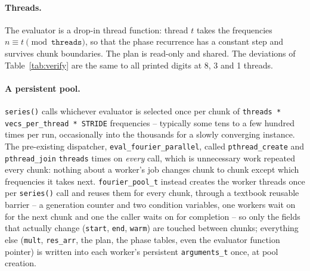 \documentclass[11pt]{article}
\begin{document}
\paragraph{Threads.} The evaluator is a drop-in thread function: thread $t$ takes the frequencies
$n\equiv t\pmod{\texttt{threads}}$, so that the phase recurrence has a constant step and survives
chunk boundaries. The plan is read-only and shared. The deviations of Table~\ref{tab:verify} are
the same to all printed digits at 8, 3 and 1 threads.

\paragraph{A persistent pool.} \texttt{series()} calls whichever evaluator is selected once per
chunk of \texttt{threads * vecs\_per\_thread * STRIDE} frequencies -- typically some tens to a few
hundred times per run, occasionally into the thousands for a slowly converging instance. The
pre-existing dispatcher, \texttt{eval\_fourier\_parallel}, called
\texttt{pthread\_create} and \texttt{pthread\_join} \texttt{threads} times on \emph{every} call,
which is unnecessary work repeated every chunk: nothing about a worker's job changes chunk to
chunk except which frequencies it takes next. \texttt{fourier\_pool\_t} instead creates the
worker threads once per \texttt{series()} call and reuses them for every chunk, through a
textbook reusable barrier -- a generation counter and two condition variables, one workers wait on
for the next chunk and one the caller waits on for completion -- so only the fields that actually
change (\texttt{start}, \texttt{end}, \texttt{warm}) are touched between chunks; everything else
(\texttt{mult}, \texttt{res\_arr}, the plan, the phase tables, even the evaluator function pointer)
is written into each worker's persistent \texttt{arguments\_t} once, at pool creation.
\end{document}
